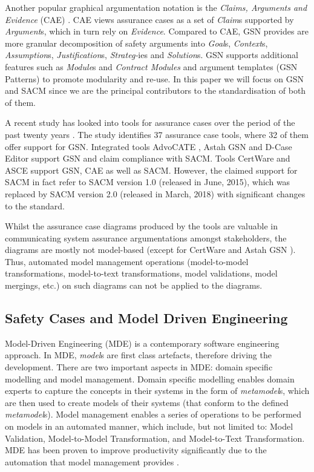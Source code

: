 Another popular graphical argumentation notation is the \textit{Claims, Arguments and Evidence} (CAE) \cite{bishop2000methodology}. 
CAE views assurance cases as a set of \textit{Claim}s supported by \textit{Argument}s, which in turn rely on \textit{Evidence}.
Compared to CAE, GSN provides are more granular decomposition of safety arguments into \textit{Goal}s, \textit{Context}s, \textit{Assumption}s, \textit{Justification}s, \textit{Strateg-}ies and \textit{Solution}s. GSN supports additional features such as \textit{Module}s and \textit{Contract Modules} and argument templates (GSN Patterns) to promote modularity and re-use.
In this paper we will focus on GSN and SACM since we are the principal contributors to the standardisation of both of them.

A recent study has looked into tools for assurance cases over the period of the past twenty years \cite{maksimov2018}. 
The study identifies 37 assurance case tools, where 32 of them offer support for GSN. 
Integrated tools AdvoCATE \cite{denney2017tool}, Astah GSN \cite{larrucea2017supporting} and D-Case Editor \cite{matsuno2010dependability} support GSN and claim compliance with SACM. 
Tools CertWare \cite{barry2011certware} and ASCE \cite{netkachova2014tool} support GSN, CAE as well as SACM.
However, the claimed support for SACM in fact refer to SACM version 1.0 (released in June, 2015), which was replaced by SACM version 2.0 (released in March, 2018) with significant changes to the standard.

Whilst the assurance case diagrams produced by the tools are valuable in communicating system assurance argumentations amongst stakeholders, the diagrams are mostly not model-based (except for CertWare \cite{barry2011certware} and Astah GSN \cite{larrucea2017supporting}). 
Thus, automated model management operations (model-to-model transformations, model-to-text transformations, model validations, model mergings, etc.) on such diagrams can not be applied to the diagrams. 

\subsection{Safety Cases and Model Driven Engineering}
Model-Driven Engineering (MDE) is a contemporary software engineering approach. 
In MDE, \textit{model}s are first class artefacts, therefore driving the development. 
There are two important aspects in MDE: domain specific modelling and model management. 
Domain specific modelling enables domain experts to capture the concepts in their systems in the form of \textit{metamodel}s, which are then used to create models of their systems (that conform to the defined \textit{metamodel}s). 
Model management enables a series of operations to be performed on models in an automated manner, which include, but not limited to: Model Validation, Model-to-Model Transformation, and Model-to-Text Transformation.
MDE has been proven to improve productivity significantly due to the automation that model management provides \cite{jaaksi2002developing, karna2009evaluating}. 

